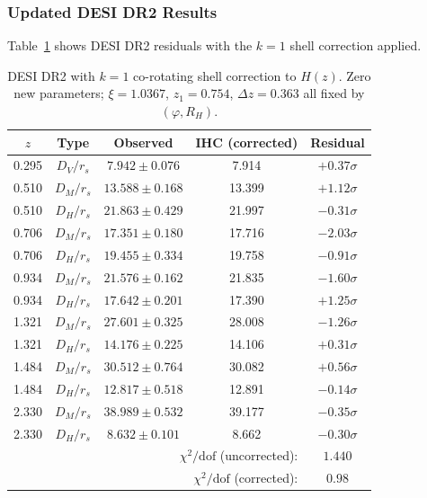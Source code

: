 \documentclass[12pt,a4paper]{article}
\begin{document}
\subsubsection{Updated DESI DR2 Results}

Table~\ref{tab:desi_corr} shows DESI DR2 residuals with the $k=1$ shell correction
applied.

\begin{table}[htbp]
\centering
\caption{DESI DR2 with $k=1$ co-rotating shell correction to $H(z)$.
Zero new parameters; $\xi = 1.0367$, $z_1 = 0.754$, $\Delta z = 0.363$
all fixed by $(\varphi, R_H)$.}
\label{tab:desi_corr}
\small
\begin{tabular}{ccccc}
\toprule
$z$ & Type & Observed & IHC (corrected) & Residual \\
\midrule
0.295 & $D_V/r_s$ & $7.942 \pm 0.076$ & 7.914 & $+0.37\sigma$ \\
0.510 & $D_M/r_s$ & $13.588 \pm 0.168$ & 13.399 & $+1.12\sigma$ \\
0.510 & $D_H/r_s$ & $21.863 \pm 0.429$ & 21.997 & $-0.31\sigma$ \\
0.706 & $D_M/r_s$ & $17.351 \pm 0.180$ & 17.716 & $-2.03\sigma$ \\
0.706 & $D_H/r_s$ & $19.455 \pm 0.334$ & 19.758 & $-0.91\sigma$ \\
0.934 & $D_M/r_s$ & $21.576 \pm 0.162$ & 21.835 & $-1.60\sigma$ \\
0.934 & $D_H/r_s$ & $17.642 \pm 0.201$ & 17.390 & $+1.25\sigma$ \\
1.321 & $D_M/r_s$ & $27.601 \pm 0.325$ & 28.008 & $-1.26\sigma$ \\
1.321 & $D_H/r_s$ & $14.176 \pm 0.225$ & 14.106 & $+0.31\sigma$ \\
1.484 & $D_M/r_s$ & $30.512 \pm 0.764$ & 30.082 & $+0.56\sigma$ \\
1.484 & $D_H/r_s$ & $12.817 \pm 0.518$ & 12.891 & $-0.14\sigma$ \\
2.330 & $D_M/r_s$ & $38.989 \pm 0.532$ & 39.177 & $-0.35\sigma$ \\
2.330 & $D_H/r_s$ & $8.632 \pm 0.101$ & 8.662 & $-0.30\sigma$ \\
\midrule
\multicolumn{4}{r}{$\chi^2/\mathrm{dof}$ (uncorrected):} & $1.440$ \\
\multicolumn{4}{r}{$\chi^2/\mathrm{dof}$ (corrected):} & $\mathbf{0.98}$ \\
\bottomrule
\end{tabular}
\end{table}
\end{document}
